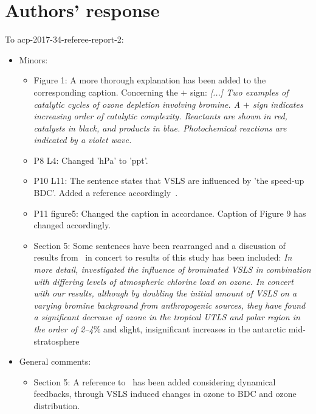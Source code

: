 \thispagestyle{empty}
\section*{Authors' response}
To acp-2017-34-referee-report-2:
\begin{itemize}
\item Minors:
  \begin{itemize}
  \item[]Figure 1: A more thorough explanation has been added to the corresponding caption. Concerning the $+$ sign: \emph{[...] Two examples of catalytic cycles of ozone depletion involving bromine. A $+$ sign indicates increasing order of catalytic complexity. Reactants are shown in red, catalysts in black, and products in blue. Photochemical reactions are indicated by a violet wave.}
  \item[]P8 L4: Changed 'hPa' to 'ppt'.
  \item[]P10 L11: The sentence states that VSLS are influenced by 'the speed-up BDC'. Added a reference accordingly~\citep{GRL:Hossaini2012}.
  \item[]P11 figure5: Changed the caption in accordance. Caption of Figure 9 has changed accordingly.
  \item[]Section 5: Some sentences have been rearranged and a discussion of results from~\citet{ACP:Yang2014} in concert to results of this study has been included: \emph{In more detail,\citet{ACP:Yang2014} investigated the influence of brominated VSLS in combination with differing levels of atmospheric chlorine load on ozone. In concert with our results, although by doubling the initial amount of VSLS on a varying bromine background from anthropogenic sources, they have found a significant decrease of ozone in the tropical UTLS and polar region in the order of 2--4}\% and slight, insignificant increases in the antarctic mid-stratosphere~\citep[Fig.~1e]{ACP:Yang2014}
  \end{itemize}
\item General comments:
  \begin{itemize}
  \item[]Section 5: A reference to~\citet{ACP:Braesicke2013} has been added considering dynamical feedbacks, through VSLS induced changes in ozone to BDC and ozone distribution.
  \end{itemize}
\end{itemize}
\newpage
